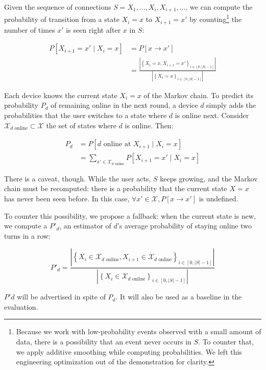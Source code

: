 Given the \squad sequence of connections $S = X_1, \dots, X_i, X_{i+1}, \dots$,
we can compute the probability of transition from a state $X_i=x$ to $X_{i+1}=x'$ by counting\footnote{%
	Because we work with low-probability events observed with a small amount of data, there is a possibility that an event never occurs in $S$. 
	To counter that, we apply additive smoothing while computing probabilities. 
	We left this engineering optimization out of the demonstration for clarity.
} the number of times $x'$ is seen right after $x$ in $S$:

\begin{align*}
P\left[X_{i+1}=x' \mid X_i=x \right] &= P\left[x \rightarrow x' \right] \\&= \frac{\left| \left\{ X_i = x, X_{i+1} = x' \right\}_{i \in \left[0, |S| - 1\right]} \right|}{\left| \left\{ X_i = x \right\}_{i \in \left[0, |S| - 1\right]} \right|}
\end{align*}

Each device knows the current state $X_i=x$ of the Markov chain.
To predict its probability $P_d$ of remaining online in the next round, 
a device $d$ simply adds the probabilities that the user switches to a state where $d$ is online next.
Consider $\mathcal{X}_{d\text{ online}} \subset \mathcal{X}$ the set of states where $d$ is online. Then:

\begin{align*}
P_d & = P\left[d\text{ online at }X_{i+1} \mid X_i=x\right] \\ & = \sum\limits_{x' \in \mathcal{X}_{d\text{ online}}} P\left[ X_{i+1}=x' \mid X_i=x \right]
\end{align*}

There is a caveat, though.
While the user acts, $S$ keeps growing, and the Markov chain must be recomputed: there is a probability that the current state $X=x$ has never been seen before.
In this case, $\forall x' \in \mathcal{X}, P\left[x \rightarrow x'\right]$ is undefined.

To counter this possibility, we propose a fallback:
when the current state is new, we compute a $P'_d$, an estimator of $d$'s average probability of staying online two turns in a row:

$$ P'_d = \frac{\left| \left\{ X_i \in \mathcal{X}_{d\text{ online}}, X_{i+1} \in \mathcal{X}_{d\text{ online}} \right\}_{i \in \left[0, |S| - 1\right]} \right|}{\left| \left\{ X_i \in \mathcal{X}_{d\text{ online}} \right\}_{i \in \left[0, |S| - 1\right]} \right|} $$

$P'd$ will be advertised in spite of $P_d$. It will also be used as a baseline in the evaluation.

